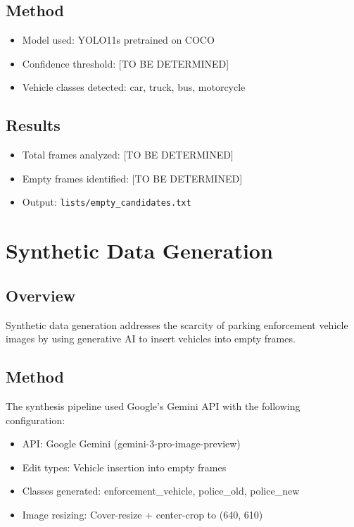 \documentclass[12pt,a4paper]{article}
\begin{document}
\subsection{Method}

\begin{itemize}
	\item Model used: YOLO11s pretrained on COCO
	\item Confidence threshold: [TO BE DETERMINED]
	\item Vehicle classes detected: car, truck, bus, motorcycle
\end{itemize}

\subsection{Results}

\begin{itemize}
	\item Total frames analyzed: [TO BE DETERMINED]
	\item Empty frames identified: [TO BE DETERMINED]
	\item Output: \texttt{lists/empty\_candidates.txt}
\end{itemize}

\section{Synthetic Data Generation}

\subsection{Overview}

Synthetic data generation addresses the scarcity of parking enforcement vehicle images by using generative AI to insert vehicles into empty frames.

\subsection{Method}

The synthesis pipeline used Google's Gemini API with the following configuration:

\begin{itemize}
	\item API: Google Gemini (gemini-3-pro-image-preview)
	\item Edit types: Vehicle insertion into empty frames
	\item Classes generated: enforcement\_vehicle, police\_old, police\_new
	\item Image resizing: Cover-resize + center-crop to (640, 610)
\end{itemize}
\end{document}
